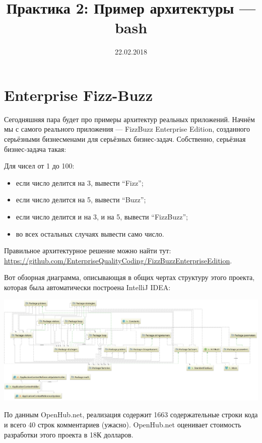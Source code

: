 \documentclass[a5paper]{article}
\title{Практика 2: Пример архитектуры --- bash}
\date{22.02.2018}
\begin{document}
\maketitle
\thispagestyle{empty}

\section{Enterprise Fizz-Buzz}

Сегодняшняя пара будет про примеры архитектур реальных приложений. Начнём мы с самого реального приложения --- FizzBuzz Enterprise Edition, созданного серьёзными бизнесменами для серьёзных бизнес-задач. Собственно, серьёзная бизнес-задача такая:

Для чисел от 1 до 100:
\begin{itemize}
	\item если число делится на 3, вывести ``Fizz'';
	\item если число делится на 5, вывести ``Buzz'';
	\item если число делится и на 3, и на 5, вывести ``FizzBuzz'';
	\item во всех остальных случаях вывести само число.
\end{itemize}

Правильное архитектурное решение можно найти тут: \url{https://github.com/EnterpriseQualityCoding/FizzBuzzEnterpriseEdition}.

Вот обзорная диаграмма, описывающая в общих чертах структуру этого проекта, которая была автоматически построена IntelliJ IDEA:

\begin{center}
	\includegraphics[width=\textwidth]{fizzBuzzArchitecture.png}
\end{center}

По данным OpenHub.net, реализация содержит 1663 содержательные строки кода и всего 40 строк комментариев (ужасно). OpenHub.net оценивает стоимость разработки этого проекта в 18К долларов.
\end{document}
